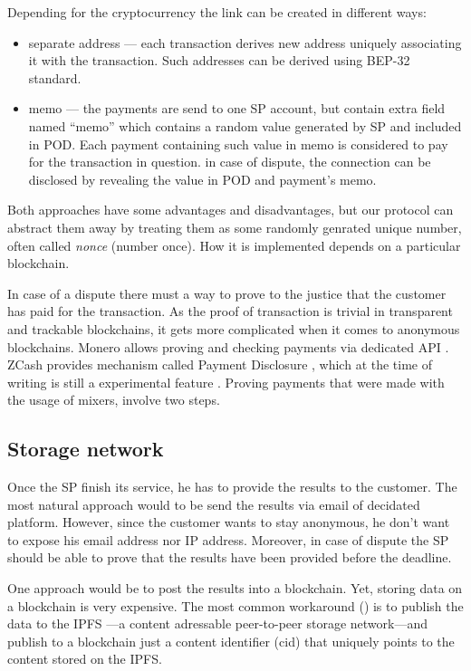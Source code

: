 \documentclass{ieeeaccess}
\begin{document}
Depending for the cryptocurrency the link can be created in different
ways:

\begin{itemize}

\item
  separate address --- each transaction derives new address uniquely
  associating it with the transaction. Such addresses can be derived
  using BEP-32 standard.
\item
  memo --- the payments are send to one SP account, but contain extra
  field named ``memo'' which contains a random value generated by SP and
  included in POD. Each payment containing such value in memo is
  considered to pay for the transaction in question. in case of dispute,
  the connection can be disclosed by revealing the value in POD and
  payment's memo.
\end{itemize}

Both approaches have some advantages and disadvantages, but our protocol
can abstract them away by treating them as some randomly genrated unique
number, often called \textit{nonce} (number once). How it is implemented
depends on a particular blockchain.

In case of a dispute there must a way to prove to the justice that the
customer has paid for the transaction. As the proof of transaction is
trivial in transparent and trackable blockchains, it gets more
complicated when it comes to anonymous blockchains. Monero allows
proving and checking payments via dedicated API \cite{Howtopro46}.
ZCash provides mechanism called Payment Disclosure \cite{AnIntrod25},
which at the time of writing is still a experimental feature
\cite{paymentd11}. Proving payments that were made with the usage of
mixers, involve two steps.

\subsection{Storage network}\label{storage-network}
Once the SP finish its service, he has to provide the results to the
customer. The most natural approach would to be send the results via
email of decidated platform. However, since the customer wants to stay
anonymous, he don't want to expose his email address nor IP address.
Moreover, in case of dispute the SP should be able to prove that the
results have been provided before the deadline.

One approach would be to post the results into a blockchain. Yet,
storing data on a blockchain is very expensive. The most common
workaround
(\cite{shahid2020blockchain, wang2019auditable, chen2017improved, Usageide95})
is to publish the data to the IPFS \cite{benet2014ipfs}—a content
adressable peer-to-peer storage network—and publish to a blockchain
just a content identifier (cid) that uniquely points to the content
stored on the IPFS.
\end{document}
